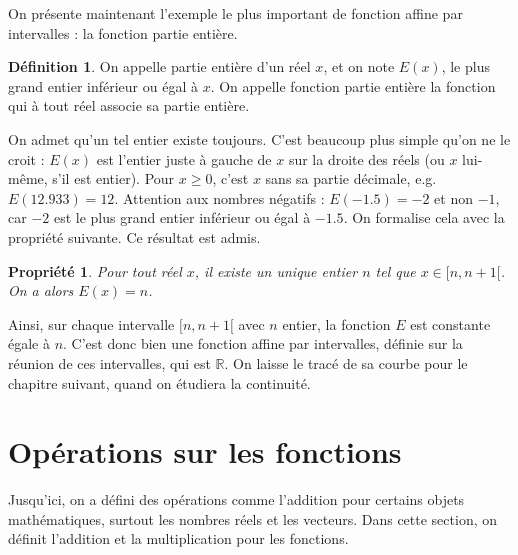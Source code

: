 \documentclass[12pt,a4paper]{article}
\theoremstyle{plain}
\newtheorem{property}[theorem]{Propriété}
\theoremstyle{definition}
\newtheorem{definition}[theorem]{Définition}
\theoremstyle{remark}
\begin{document}
On présente maintenant l'exemple le plus important de fonction affine par
intervalles : la fonction partie entière.

\begin{tcolorbox}[navybar]
  \begin{definition}
    On appelle partie entière d'un réel $x$, et on note $E(x)$, le plus grand entier
    inférieur ou égal à $x$. On appelle fonction partie entière la fonction qui à tout
    réel associe sa partie entière.
  \end{definition}
\end{tcolorbox}

On admet qu'un tel entier existe toujours. C'est beaucoup plus simple qu'on ne le
croit : $E(x)$ est l'entier juste à gauche de $x$ sur la droite des réels (ou $x$
lui-même, s'il est entier). Pour $x \ge 0$, c'est $x$ sans sa partie décimale, e.g.
$E(12.933) = 12$. Attention aux nombres négatifs : $E(-1.5) = -2$ et non $-1$, car
$-2$ est le plus grand entier inférieur ou égal à $-1.5$. On formalise cela avec la
propriété suivante. Ce résultat est admis.

\begin{tcolorbox}[graybar]
  \begin{property}
    Pour tout réel $x$, il existe un unique entier $n$ tel que $x \in [n, n + 1[$.
    On a alors $E(x) = n$.
  \end{property}
\end{tcolorbox}

Ainsi, sur chaque intervalle $[n, n + 1[$ avec $n$ entier, la fonction $E$ est
constante égale à $n$. C'est donc bien une fonction affine par intervalles, définie
sur la réunion de ces intervalles, qui est $\mathbb{R}$. On laisse le tracé de sa
courbe pour le chapitre suivant, quand on étudiera la continuité.

\section{Opérations sur les fonctions}

Jusqu'ici, on a défini des opérations comme l'addition pour certains objets
mathématiques, surtout les nombres réels et les vecteurs. Dans cette section, on
définit l'addition et la multiplication pour les fonctions.
\end{document}
